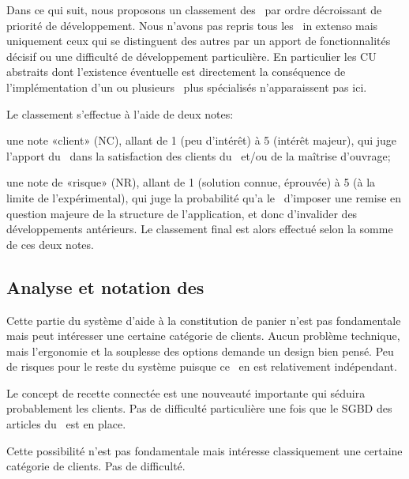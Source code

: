 Dans ce qui suit, nous proposons un classement des \cu\ par ordre décroissant de priorité de développement.
Nous n'avons pas repris tous les \cu\ in extenso mais uniquement ceux qui se distinguent des autres par un apport de fonctionnalités décisif ou une difficulté de développement particulière. 
En particulier les CU abstraits dont l'existence éventuelle est directement la conséquence de l'implémentation d'un ou plusieurs \cu\ plus spécialisés n'apparaissent pas ici.\par
Le classement s'effectue à l'aide de deux notes:
\startitemize[n]
\item une note «client» (NC), allant de 1 (peu d'intérêt) à 5 (intérêt majeur), qui juge l'apport du \cu\ dans la satisfaction des clients du \fm\ et/ou de la maîtrise d'ouvrage;
\item une note de «risque» (NR), allant de 1 (solution connue, éprouvée) à 5 (à la limite de l'expérimental), qui juge la probabilité qu'a le \cu\ d'imposer une remise en question majeure de la structure de l'application, et donc d'invalider des développements antérieurs.
\stopitemize
Le classement final est alors effectué selon la somme de ces deux notes.

\subsection{Analyse et notation des \cu}

\def\NC#1{\sym{\bf NC~#1}}%
\def\NR#1{\sym{\bf NR~#1}}%
\def\startnote{\startitemize[packed][distance=2em]}%
\let\stopnote\stopitemize

\startnote
\NC2 Cette partie du système d'aide à la constitution de panier n'est pas fondamentale mais peut intéresser une certaine catégorie de clients.
\NR2 Aucun problème technique, mais l'ergonomie et la souplesse des options demande un design bien pensé.
Peu de risques pour le reste du système puisque ce \cu\ en est relativement indépendant.
\stopnote

\startnote
\NC4 Le concept de recette connectée est une nouveauté importante qui séduira probablement les clients.
\NR2 Pas de difficulté particulière une fois que le SGBD des articles du \fm\ est en place.
\stopnote

\startnote
\NC2 Cette possibilité n'est pas fondamentale mais intéresse classiquement une certaine catégorie de clients.
\NR1 Pas de difficulté.
\stopnote

